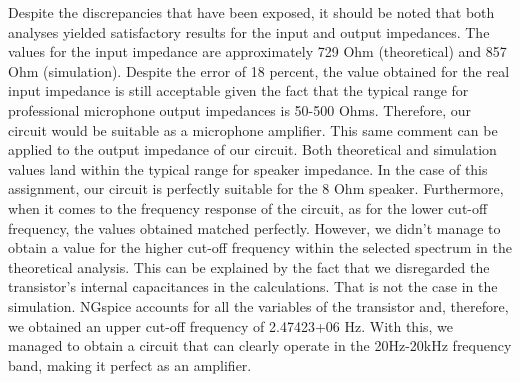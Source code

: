 Despite the discrepancies that have been exposed, it should be noted that both analyses yielded satisfactory results for the input and output impedances. The values for the input impedance are approximately 729 Ohm (theoretical) and 857 Ohm (simulation). Despite the error of 18 percent, the value obtained for the real input impedance is still acceptable given the fact that the typical range for professional microphone output impedances is 50-500 Ohms. Therefore, our circuit would be suitable as a microphone amplifier. This same comment can be applied to the output impedance of our circuit. Both theoretical and simulation values land within the typical range for speaker impedance. In the case of this assignment, our circuit is perfectly suitable for the 8 Ohm speaker.
Furthermore, when it comes to the frequency response of the circuit, as for the lower cut-off frequency, the values obtained matched perfectly. However, we didn't manage to obtain a value for the higher cut-off frequency within the selected spectrum in the theoretical analysis. This can be explained by the fact that we disregarded the transistor's internal capacitances in the calculations. That is not the case in the simulation. NGspice accounts for all the variables of the transistor and, therefore, we obtained an upper cut-off frequency of 2.47423+06 Hz. With this, we managed to obtain a circuit that can clearly operate in the 20Hz-20kHz frequency band, making it perfect as an amplifier.



